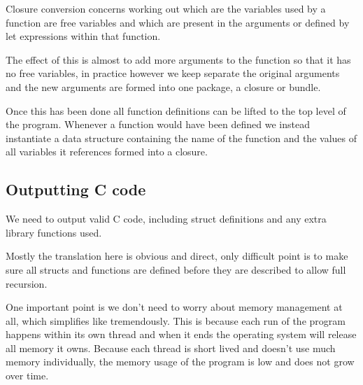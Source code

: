 \documentclass[a4paper]{article}
\begin{document}
Closure conversion concerns working out which are the variables used by a function are free variables and which are present in the arguments or defined by let expressions within that function.

The effect of this is almost to add more arguments to the function so that it has no free variables, in practice however we keep separate the original arguments and the new arguments are formed into one package, a closure or bundle.

Once this has been done all function definitions can be lifted to the top level of the program. Whenever a function would have been defined we instead instantiate a data structure containing the name of the function and the values of all variables it references formed into a closure.




\subsection{Outputting C code}

We need to output valid C code, including struct definitions and any extra library functions used.

Mostly the translation here is obvious and direct, only difficult point is to make sure all structs and functions are defined before they are described to allow full recursion.

One important point is we don't need to worry about memory management at all, which simplifies like tremendously. This is because each run of the program happens within its own thread and when it ends the operating system will release all memory it owns. Because each thread is short lived and doesn't use much memory individually, the memory usage of the program is low and does not grow over time.



\end{document}
